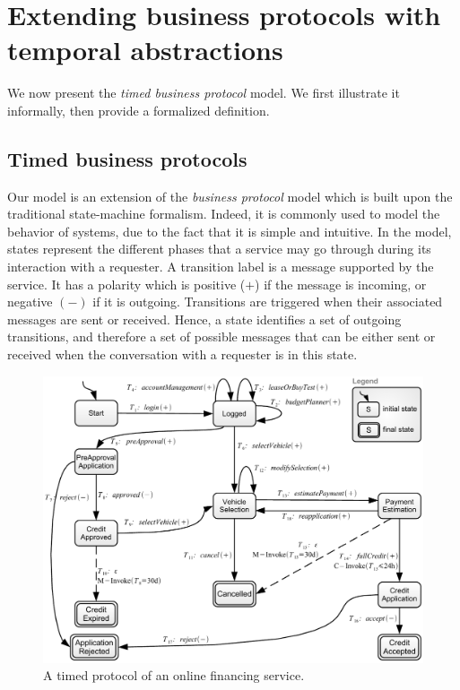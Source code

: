 
\section{Extending business protocols with temporal abstractions}


We now present the \emph{timed business protocol} model. We first illustrate it informally, then provide a formalized definition.



\subsection{Timed business protocols}


Our model is an extension of the \emph{business protocol} model \cite{BBFC04,FTBB} which is built upon the traditional state-machine formalism. Indeed, it is commonly used to model the behavior of systems, due to the fact that it is simple and intuitive.
In the model, states represent the different phases that a service may go through during its interaction with a requester. A transition label is a message supported by the service. It has a polarity which is positive ($+$) if the message is incoming, or negative $(-)$ if it is outgoing. Transitions are triggered when their associated messages are sent or received. Hence, a state identifies a set of outgoing transitions, and therefore a set of possible messages that can be either sent or received when the conversation with a requester is in this state.\\

\begin{figure}[thbp]
    \centering
    \includegraphics[width=\textwidth]{content/protocol-model/ford-credit}
    \caption{A timed protocol of an online financing service.}
    \label{fig:ford-credit}
\end{figure}

